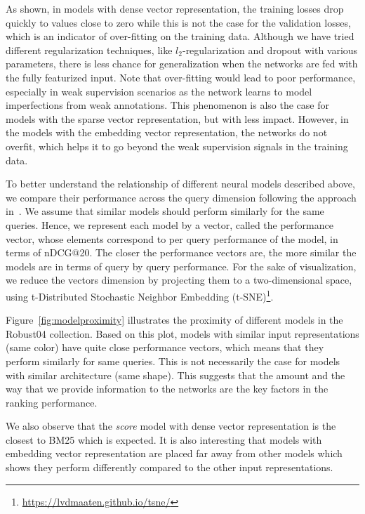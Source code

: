 \documentclass[sigconf]{acmart}
\newcommand{\modelone}{\textit{score} model\xspace}
\newcommand{\feedone}{dense vector representation\xspace}
\newcommand{\feedtwo}{sparse vector representation\xspace}
\newcommand{\feedthree}{embedding vector representation\xspace}
\begin{document}
As shown, in models with \feedone, the training losses drop quickly to values close to zero while this is not the case for the validation losses, which is an indicator of over-fitting on the training data. 
Although we have tried different regularization techniques, like $l_2$-regularization and dropout with various parameters, there is less chance for generalization when the networks are fed with the fully featurized input. Note that over-fitting would lead to poor performance, especially in weak supervision scenarios as the network learns to model imperfections from weak annotations. 
This phenomenon is also the case for models with the \feedtwo, but with less impact. However, in the models with the \feedthree, the networks do not overfit, which helps it to go beyond the weak supervision signals in the training data.

To better understand the relationship of different neural models described above, we compare their performance across the query dimension following the approach in~\citep{Mitra:2016}. 
We assume that similar models should perform similarly for the same queries. Hence, we represent each model by a vector, called the performance vector, whose elements correspond to per query performance of the model, in terms of nDCG@20. The closer the performance vectors are, the more similar the models are in terms of query by query performance. For the sake of visualization, we reduce the vectors dimension by projecting them to a two-dimensional space, using t-Distributed Stochastic Neighbor Embedding (t-SNE)\footnote{\url{https://lvdmaaten.github.io/tsne/}}.

Figure~\ref{fig:modelproximity} illustrates the proximity of different models in the Robust04 collection. Based on this plot, models with similar input representations (same color) have quite close performance vectors, which means that they perform similarly for same queries. This is not necessarily the case for models with similar architecture (same shape). 
This suggests that the amount and the way that we provide information to the networks are the key factors in the ranking performance. 

We also observe that the \modelone with \feedone is the closest to BM25 which is expected. 
It is also interesting that models with \feedthree are placed far away from other models which shows they perform differently compared to the other input representations.
\end{document}
